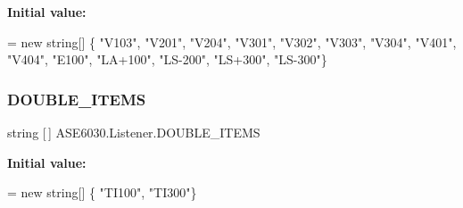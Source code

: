 {\bfseries Initial value\+:}
\begin{DoxyCode}
= \textcolor{keyword}{new} \textcolor{keywordtype}{string}[] \{
                                            \textcolor{stringliteral}{"V103"},
                                            \textcolor{stringliteral}{"V201"},
                                            \textcolor{stringliteral}{"V204"},
                                            \textcolor{stringliteral}{"V301"},
                                            \textcolor{stringliteral}{"V302"},
                                            \textcolor{stringliteral}{"V303"},
                                            \textcolor{stringliteral}{"V304"},
                                            \textcolor{stringliteral}{"V401"},
                                            \textcolor{stringliteral}{"V404"},
                                            \textcolor{stringliteral}{"E100"},
                                            \textcolor{stringliteral}{"LA+100"},
                                            \textcolor{stringliteral}{"LS-200"},
                                            \textcolor{stringliteral}{"LS+300"},
                                            \textcolor{stringliteral}{"LS-300"}\}
\end{DoxyCode}
\mbox{\label{class_a_s_e6030_1_1_listener_ad63ad730cef9c4fa931b8ec690b9ef21}} 
\subsubsection{\texorpdfstring{D\+O\+U\+B\+L\+E\+\_\+\+I\+T\+E\+MS}{DOUBLE\_ITEMS}}
{\footnotesize\ttfamily string \mbox{[}$\,$\mbox{]} A\+S\+E6030.\+Listener.\+D\+O\+U\+B\+L\+E\+\_\+\+I\+T\+E\+MS\hspace{0.3cm}{\ttfamily [private]}}

{\bfseries Initial value\+:}
\begin{DoxyCode}
= \textcolor{keyword}{new} \textcolor{keywordtype}{string}[] \{
                                            \textcolor{stringliteral}{"TI100"},
                                            \textcolor{stringliteral}{"TI300"}\}
\end{DoxyCode}
\mbox{\label{class_a_s_e6030_1_1_listener_abb016c37b10ed882195c0ad70e8a9b2f}} 
